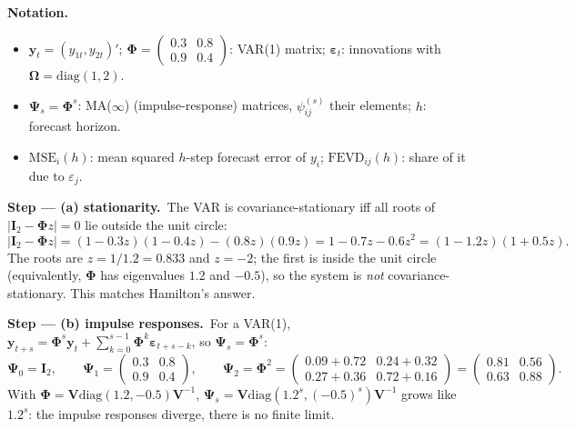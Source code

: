 \documentclass[11pt,a4paper]{article}
\newenvironment{notacao}{\par\smallskip\noindent\textbf{Notation.}\begin{itemize}[leftmargin=1.4em,topsep=1pt,itemsep=0pt]\small}{\end{itemize}}
\newcommand{\passo}[2]{\par\smallskip\noindent\textbf{Step --- #1.}~#2}
\begin{document}
\begin{sol}
\begin{notacao}
\item $\bm y_t=(y_{1t},y_{2t})'$; $\bm\Phi=\begin{pmatrix}0.3&0.8\\0.9&0.4\end{pmatrix}$: VAR(1) matrix; $\bm\varepsilon_t$: innovations with
$\bm\Omega=\mathrm{diag}(1,2)$.
\item $\bm\Psi_s=\bm\Phi^s$: MA($\infty$) (impulse-response) matrices, $\psi_{ij}^{(s)}$ their elements; $h$: forecast horizon.
\item $\mathrm{MSE}_i(h)$: mean squared $h$-step forecast error of $y_i$; $\mathrm{FEVD}_{ij}(h)$: share of it due to $\varepsilon_j$.
\end{notacao}

\passo{(a) stationarity}{The VAR is covariance-stationary iff all roots of $|\bm I_2-\bm\Phi z|=0$ lie outside the unit circle:
\begin{equation}
|\bm I_2-\bm\Phi z|=(1-0.3z)(1-0.4z)-(0.8z)(0.9z)=1-0.7z-0.6z^2=(1-1.2z)(1+0.5z).\nonumber
\end{equation}
The roots are $z=1/1.2=0.833$ and $z=-2$; the first is inside the unit circle (equivalently, $\bm\Phi$ has eigenvalues $1.2$ and
$-0.5$), so the system is \emph{not} covariance-stationary. This matches Hamilton's answer.}

\passo{(b) impulse responses}{For a VAR(1), $\bm y_{t+s}=\bm\Phi^s\bm y_t+\sum_{k=0}^{s-1}\bm\Phi^k\bm\varepsilon_{t+s-k}$, so
$\bm\Psi_s=\bm\Phi^s$:
\begin{equation}
\bm\Psi_0=\bm I_2,\qquad \bm\Psi_1=\begin{pmatrix}0.3&0.8\\0.9&0.4\end{pmatrix},\qquad
\bm\Psi_2=\bm\Phi^2=\begin{pmatrix}0.09+0.72&0.24+0.32\\0.27+0.36&0.72+0.16\end{pmatrix}=\begin{pmatrix}0.81&0.56\\0.63&0.88\end{pmatrix}.\nonumber
\end{equation}
With $\bm\Phi=\bm V\mathrm{diag}(1.2,-0.5)\bm V^{-1}$, $\bm\Psi_s=\bm V\mathrm{diag}(1.2^s,(-0.5)^s)\bm V^{-1}$ grows like $1.2^s$: the
impulse responses diverge, there is no finite limit.}


\end{sol}
\end{document}
